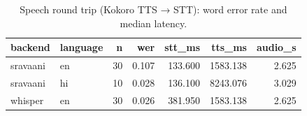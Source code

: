 \begin{table}[htbp]
\centering
\small
\caption{Speech round trip (Kokoro TTS → STT): word error rate and median latency.}
\label{tab:speech_summary}
\begin{tabular}{l l r r r r r}
\toprule
backend & language & n & wer & stt\_ms & tts\_ms & audio\_s \\
\midrule
sravaani & en & 30 & 0.107 & 133.600 & 1583.138 & 2.625 \\
sravaani & hi & 10 & 0.028 & 136.100 & 8243.076 & 3.029 \\
whisper & en & 30 & 0.026 & 381.950 & 1583.138 & 2.625 \\
\bottomrule
\end{tabular}
\end{table}

